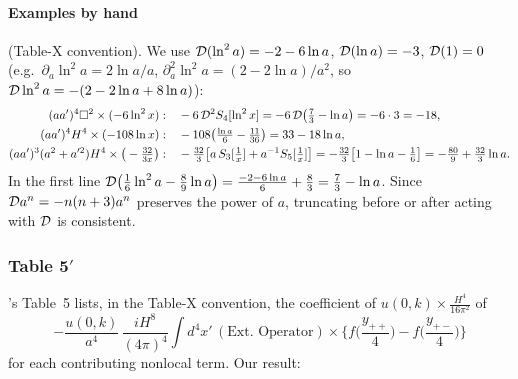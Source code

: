 \paragraph{Examples by hand} (Table-X convention). We use $\mathcal{D}(\ln^2a)=-2-6\ln a$, $\mathcal{D}(\ln a)=-3$, $\mathcal{D}(1)=0$
(e.g.\ $\partial_a\ln^2a=2\ln a/a$, $\partial_a^2\ln^2a=(2-2\ln a)/a^2$, so $\mathcal{D}\ln^2a=-(2-2\ln a+8\ln a)$):
\begin{equation}
\begin{aligned}
(aa')^4\square^2\times(-6\ln^2x):&\quad -6\,\mathcal{D}^2S_4[\ln^2x]=-6\,\mathcal{D}\big(\tfrac73-\ln a\big)=-6\cdot3=-18,\\
(aa')^4H^4\times(-108\ln x):&\quad -108\big(\tfrac{\ln a}6-\tfrac{11}{36}\big)=33-18\ln a,\\
(aa')^3(a^2+a'^2)H^4\times\big(-\tfrac{32}{3x}\big):&\quad -\tfrac{32}3\big[a\,S_3[\tfrac1x]+a^{-1}S_5[\tfrac1x]\big]=-\tfrac{32}3\big[1-\ln a-\tfrac16\big]=-\tfrac{80}9+\tfrac{32}3\ln a.
\end{aligned}
\label{eq:ch09-t5ex}
\end{equation}
In the first line $\mathcal{D}\big(\tfrac16\ln^2a-\tfrac89\ln a\big)=\tfrac{-2-6\ln a}6+\tfrac83=\tfrac73-\ln a$.
Since $\mathcal{D} a^n=-n(n+3)a^n$ preserves the power of $a$, truncating before or after acting with $\mathcal{D}$ is consistent.

\subsubsection{Table 5\texorpdfstring{$'$}{'}}
\PII's Table~5 \tP{} lists, in the Table-X convention, the coefficient of $u(0,k)\times\frac{H^4}{16\pi^2}$ of
\begin{equation*}
-\frac{u(0,k)}{a^4}\,\frac{iH^8}{(4\pi)^4}\int d^4x'\,(\text{Ext.\ Operator})\times\Big\{f\Big(\frac{y_{++}}4\Big)-f\Big(\frac{y_{+-}}4\Big)\Big\}
\end{equation*}
for each contributing nonlocal term. Our result:

